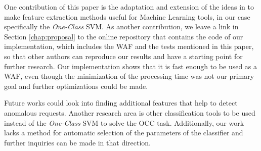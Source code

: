 One contribution of this paper is the adaptation and extension of the ideas
in \cite{kruegel2003anomaly} to make feature extraction methods useful for
Machine Learning tools, in our case specifically the \textit{One-Class} SVM.
As another contribution, we leave a link in Section \ref{chap:proposal}
to the online repository that contains the code of our implementation,
which includes the WAF and the tests mentioned in this paper, so that
other authors can reproduce our results and have a starting point for
further research.
Our implementation shows that it is fast enough to be used as a WAF, even
though the minimization of the processing time was not our primary goal
and further optimizations could be made.

Future works could look into finding additional features that help to
detect anomalous requests.
Another research area is other classification tools to be used instead
of the \textit{One-Class} SVM to solve the OCC task.
Additionally, our work lacks a method for automatic selection of the
parameters of the classifier and further inquiries can be made in that
direction.
